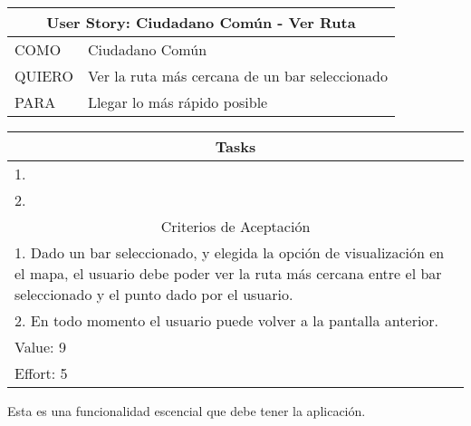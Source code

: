     \begin{table}[H]
        \centering
        \begin{tabular}{| p{1.5cm}| p{10.2cm} |}
            \hline
            \multicolumn{2}{|c|}{User Story: Ciudadano Común - Ver Ruta} \\
            \hline
            COMO & Ciudadano Común \\ \hline
            QUIERO & Ver la ruta más cercana de un bar seleccionado \\ \hline
            PARA & Llegar lo más rápido posible \\ \hline
            \hline
        \end{tabular}
        \begin{tabular}{| p{12.118cm} |}
            \multicolumn{1}{|c|}{Tasks} \\
            \hline
            1. \\ \hline
            2. \\ \hline
            \hline
            \multicolumn{1}{|c|}{Criterios de Aceptación} \\
            \hline
            1. Dado un bar seleccionado, y elegida la opción de visualización en el mapa, el usuario debe poder ver la ruta más cercana entre el bar seleccionado y el punto dado por el usuario. \\ \hline
            2. En todo momento el usuario puede volver a la pantalla anterior. \\ \hline
            Value: 9 \\ \hline
            Effort: 5 \\ \hline
        \end{tabular}
    \end{table}
    
     Esta es una funcionalidad escencial que debe tener la aplicación. \\

